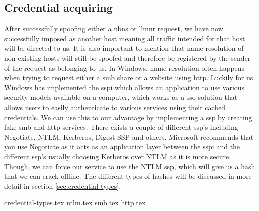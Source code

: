 \documentclass{article}
\begin{document}
\subsection{Credential acquiring}
\label{sec:credential-acquiring}
After successfully spoofing either a \gls{nbns} or \gls{llmnr} request, we have now successfully imposed as another host meaning all traffic intended for that host will be directed to us. It is also important to mention that name resolution of non-existing hosts will still be spoofed and therefore be registered by the sender of the request as belonging to us. In Windows, name resolution often happens when trying to request either a \gls{smb} share or a website using \gls{http}. Luckily for us Windows has implemented the \gls{sspi} which allows an application to use various security models available on a computer, which works as a \gls{sso} solution that allows users to easily authenticate to various services using their cached credentials\cite{url:microsoft:sspi-model}. We can use this to our advantage by implementing a \gls{ssp} by creating fake \gls{smb} and \gls{http} services. There exists a couple of different \gls{ssp}'s including Negotiate, NTLM, Kerberos, Digest SSP and others. Microsoft recommends that you use Negotiate as it acts as an application layer between the \gls{sspi} and the different \gls{ssp}'s usually choosing Kerberos over NTLM as it is more secure. Though, we can force our service to use the NTLM \gls{ssp}, which will give us a hash that we can crack offline. The different types of hashes will be discussed in more detail in section \ref{sec:credential-types}. 

{credential-types.tex}
{ntlm.tex}
{smb.tex}
{http.tex}
\end{document}
